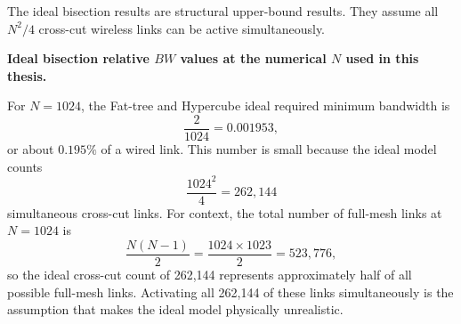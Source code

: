 \documentclass[conference]{IEEEtran}
\begin{document}
The ideal bisection results are structural upper-bound results. They assume all \(N^2/4\) cross-cut wireless links can be active simultaneously.

\begin{table}[!t]
\centering
\caption{Ideal full-mesh bisection required minimum \(B_{\mathrm{wireless}}/B_{\mathrm{wired}}\) by topology.}
\scriptsize
{}
\end{table}

\begin{center}
\textbf{Ideal bisection relative \(BW\) values at the numerical \(N\) used in this thesis.}

\scriptsize
{}
\end{center}

For \(N=1024\), the Fat-tree and Hypercube ideal required minimum bandwidth is
\begin{equation}
\frac{2}{1024}=0.001953,
\end{equation}
or about \(0.195\%\) of a wired link. This number is small because the ideal model counts
\begin{equation}
\frac{1024^2}{4}=262{,}144
\end{equation}
simultaneous cross-cut links. For context, the total number of full-mesh links at \(N=1024\) is
\begin{equation}
\frac{N(N-1)}{2} = \frac{1024 \times 1023}{2} = 523{,}776,
\end{equation}
so the ideal cross-cut count of 262,144 represents approximately half of all possible full-mesh links. Activating all 262,144 of these links simultaneously is the assumption that makes the ideal model physically unrealistic.
\end{document}
